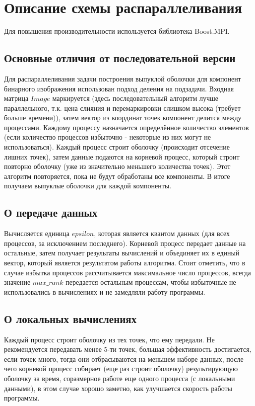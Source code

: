 \documentclass[12pt]{article}
\begin{document}
\section*{Описание схемы распараллеливания}
Для повышения производительности используется библиотека Boost.MPI.

\subsection*{Основные отличия от последовательной версии}
Для распараллеливания задачи построения выпуклой оболочки для компонент бинарного изображения использован подход деления на подзадачи. Входная матрица \( Image \) маркируется (здесь последовательный алгоритм лучше параллельного, т.к. цена слияния и перемаркировки слишком высока (требует больше времени)), затем вектор из координат точек компонент делится между процессами. Каждому процессу назначается определённое количество элементов (если количество процессов избыточно - некоторые из них могут не использоваться). Каждый процесс строит оболочку (происходит отсечение лишних точек), затем данные подаются на корневой процесс, который строит повторно оболочку (уже из значительно меньшего количества точек). Этот алгоритм повторяется, пока не будут обработаны все компоненты. В итоге получаем выпуклые оболочки для каждой компоненты.

\subsection*{О передаче данных}
Вычисляется единица \( epsilon\), которая является квантом данных (для всех процессов, за исключением последнего). Корневой процесс передает данные на остальные, затем получает результаты вычислений и объединяет их в единый вектор, который является результатом работы алгоритма. Стоит отметить, что в случае избытка процессов рассчитывается максимальное число процессов, всегда значение  \( max\_rank\) передается остальным процессам, чтобы избыточные не использовались в вычислениях и не замедляли работу программы.

\subsection*{О локальных вычислениях}
Каждый процесс строит оболочку из тех точек, что ему передали. Не рекомендуется передавать менее 5-ти точек, большая эффективность достигается, если точек много, тогда они отбрасываются на меньшем наборе данных, после чего корневой процесс собирает (еще раз строит оболочку) результирующую оболочку за время, соразмерное работе еще одного процесса (с локальными данными), в этом случае хорошо заметно, как улучшается скорость работы программы.
\end{document}
